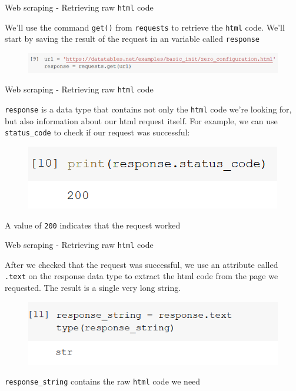 \documentclass[aspectratio=169]{beamer}
\begin{document}
\begin{frame}{Web scraping - Retrieving raw \texttt{html} code}

	We'll use the command \texttt{get()} from \texttt{requests} to retrieve the \texttt{html} code. We'll start by saving the result of the request in an variable called \texttt{response}

	\begin{figure}
		\centering
		\includegraphics[width=\linewidth]{img/response.png}
	\end{figure}

\end{frame}

\begin{frame}{Web scraping - Retrieving raw \texttt{html} code}

	\texttt{response} is a data type that contains not only the \texttt{html} code we're looking for, but also information about our html request itself. For example, we can use \texttt{status\_code} to check if our request was successful:

	\begin{figure}
		\centering
		\includegraphics[width=0.4\linewidth]{img/status_code.png}
	\end{figure}

	A value of \texttt{200} indicates that the request worked

\end{frame}

\begin{frame}{Web scraping - Retrieving raw \texttt{html} code}

	After we checked that the request was successful, 
	we use an attribute called \texttt{.text} on the response data type 
	to extract the html code from the page we requested. 
	The result is a single very long string.

	\begin{figure}
		\centering
		\includegraphics[width=0.4\linewidth]{img/response_string.png}
	\end{figure}

	\texttt{response\_string} contains the raw \texttt{html} code we need

\end{frame}
\end{document}
